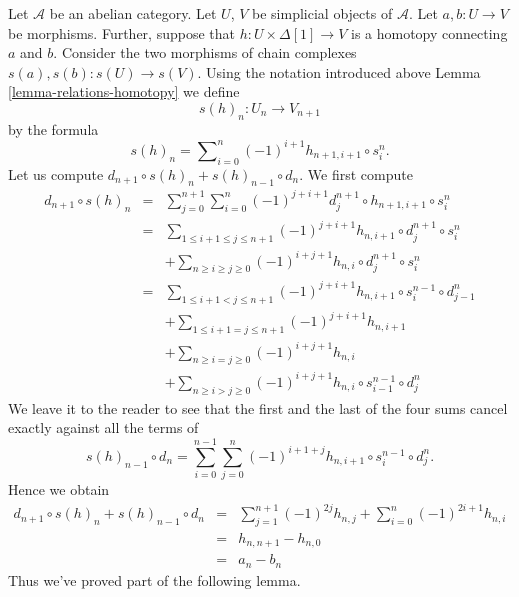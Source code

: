 \noindent
Let $\mathcal{A}$ be an abelian category.
Let $U$, $V$ be simplicial objects of $\mathcal{A}$.
Let $a, b : U \to V$ be morphisms. Further, suppose
that $h : U \times \Delta[1] \to V$ is a homotopy
connecting $a$ and $b$. Consider the two morphisms
of chain complexes
$s(a), s(b) : s(U) \longrightarrow s(V)$.
Using the notation introduced above Lemma \ref{lemma-relations-homotopy}
we define
$$
s(h)_n : U_n \longrightarrow V_{n + 1}
$$
by the formula
\begin{equation}
\label{equation-homotopy-to-homotopy}
s(h)_n = \sum\nolimits_{i = 0}^n (-1)^{i + 1} h_{n + 1, i + 1} \circ s^n_i.
\end{equation}
Let us compute $d_{n + 1} \circ s(h)_n + s(h)_{n - 1} \circ d_n$.
We first compute
\begin{eqnarray*}
d_{n + 1} \circ s(h)_n & = &
\sum\nolimits_{j = 0}^{n + 1}
\sum\nolimits_{i = 0}^n
(-1)^{j + i + 1}
d^{n + 1}_j \circ h_{n + 1, i + 1} \circ s^n_i \\
& = &
\sum\nolimits_{1 \leq i + 1 \leq j \leq n + 1}
(-1)^{j + i + 1}
h_{n, i + 1} \circ d^{n + 1}_j \circ s^n_i \\
& &
+
\sum\nolimits_{n \geq i \geq j \geq 0}
(-1)^{i + j + 1}
h_{n, i} \circ d^{n + 1}_j \circ s^n_i \\
& = &
\sum\nolimits_{1 \leq i + 1 < j \leq n + 1}
(-1)^{j + i + 1}
h_{n, i + 1} \circ s^{n - 1}_i \circ d^n_{j - 1} \\
& &
+
\sum\nolimits_{1 \leq i + 1 = j \leq n + 1}
(-1)^{j + i + 1}
h_{n, i + 1} \\
& &
+
\sum\nolimits_{n \geq i = j \geq 0}
(-1)^{i + j + 1}
h_{n, i} \\
& &
+
\sum\nolimits_{n \geq i > j \geq 0}
(-1)^{i + j + 1}
h_{n, i} \circ s^{n - 1}_{i - 1} \circ d^n_j
\end{eqnarray*}
We leave it to the reader to see that the first and the last
of the four sums cancel exactly against all the terms of
$$
s(h)_{n - 1} \circ d_n
=
\sum_{i = 0}^{n - 1} \sum_{j = 0}^n
(-1)^{i + 1 + j} h_{n, i + 1} \circ s^{n - 1}_i \circ d^n_j.
$$
Hence we obtain
\begin{eqnarray*}
d_{n + 1} \circ s(h)_n + s(h)_{n - 1} \circ d_n
& = &
\sum_{j = 1}^{n + 1} (-1)^{2j} h_{n, j}
+
\sum_{i = 0}^n (-1)^{2i + 1} h_{n, i} \\
& = &
h_{n, n + 1} - h_{n , 0} \\
& = &
a_n - b_n
\end{eqnarray*}
Thus we've proved part of the following lemma.

